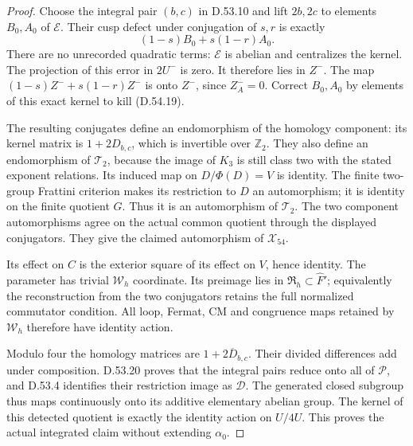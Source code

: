 \begin{proof}
Choose the integral pair \((b,c)\)
in D.53.10 and lift \(2b,2c\) to
elements \(B_0,A_0\) of \(\mathscr E\).
Their cusp defect under conjugation
of \(s,r\) is exactly
\[
               (1-s)B_0+s(1-r)A_0 .
 \tag{D.54.19}
\]
There are no unrecorded quadratic
terms: \(\mathscr E\) is abelian and
centralizes the kernel.
The projection of this error in
\(2U^-\) is zero. It therefore lies
in \(Z^-\).
The map
\((1-s)Z^-+s(1-r)Z^-\) is onto
\(Z^-\), since \(Z^-_A=0\).
Correct \(B_0,A_0\) by elements of
this exact kernel to kill (D.54.19).

The resulting conjugates define an
endomorphism of the homology component:
its kernel matrix is \(1+2D_{b,c}\),
which is invertible over \(\mathbb Z_2\).
They also define an endomorphism of
\(\mathcal T_2\), because the image
of \(K_3\) is still class two with
the stated exponent relations.
Its induced map on \(D/\Phi(D)=V\)
is identity. The finite two-group
Frattini criterion makes its restriction
to \(D\) an automorphism; it is identity
on the finite quotient \(G\).
Thus it is an automorphism of
\(\mathcal T_2\). The two component
automorphisms agree on the actual
common quotient through the displayed
conjugators. They give the claimed
automorphism of \(\mathcal X_{54}\).

Its effect on \(C\) is the exterior
square of its effect on \(V\), hence
identity. The parameter has trivial
\(\mathcal W_h\) coordinate.
Its preimage lies in \(\mathfrak R_h
\subset\widehat F'\); equivalently
the reconstruction from the two
conjugators retains the full
normalized commutator condition.
All loop, Fermat, CM and congruence
maps retained by \(\mathcal W_h\)
therefore have identity action.

Modulo four the homology matrices are
\(1+2\overline D_{b,c}\).
Their divided differences add under
composition. D.53.20 proves that the
integral pairs reduce onto all of
\(\mathcal P\), and D.53.4 identifies
their restriction image as \(\mathscr D\).
The generated closed subgroup thus
maps continuously onto its additive
elementary abelian group. The kernel
of this detected quotient is exactly
the identity action on \(U/4U\).
This proves the actual integrated
claim without extending \(\alpha_0\).


\end{proof}
